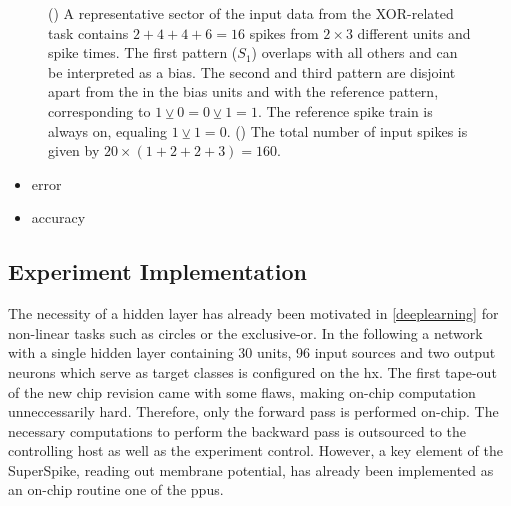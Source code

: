 \begin{figure}
	\begin{subfigure}{0.5\textwidth}
		\caption{}
		
		\label{superspiketaskpicturesector}
	\end{subfigure}
	\begin{subfigure}{0.5\textwidth}
		\caption{}
		
		\label{superspiketaskpicture}
	\end{subfigure}
	\caption{() A representative sector of the input data from the XOR-related task contains $2 + 4 + 4 + 6 = 16$ spikes from $2\times3$ different units and spike times. The first pattern ($S_1$) overlaps with all others and can be interpreted as a bias. The second and third pattern are disjoint apart from the  in the bias units and with the reference pattern, corresponding to $1 \veebar 0 = 0 \veebar 1 = 1$. The reference spike train is always on, equaling $1 \veebar 1 = 0$. () The total number of input spikes is given by $20 \times (1+2+2+3) = 160$.
	\label{superspiketaskoverview}}
\end{figure} 

\begin{itemize}
	\item error
	\item accuracy
\end{itemize}

\subsection{Experiment Implementation}
The necessity of a hidden layer has already been motivated in \cref{deeplearning} for non-linear tasks such as circles or the exclusive-or. In the following a network with a single hidden layer containing 30 units, 96 input sources and two output neurons which serve as target classes is configured on the \gls{hx}. The first tape-out of the new chip revision came with some flaws, making on-chip computation unneccessarily hard. Therefore, only the forward pass is performed on-chip. The necessary computations to perform the backward pass is outsourced to the controlling host as well as the experiment control. However, a key element of the SuperSpike, reading out membrane potential, has already been implemented as an on-chip routine one of the \glspl{ppu}.


